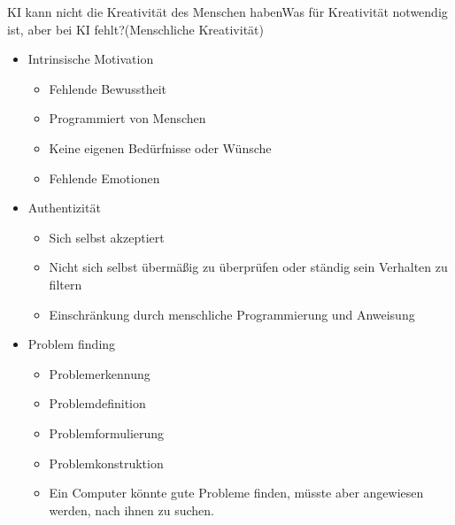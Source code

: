 \documentclass[169,9pt]{beamer}
\begin{document}
\begin{frame}{KI kann nicht die Kreativität des Menschen haben}{Was für Kreativität notwendig ist, aber bei KI fehlt?(Menschliche Kreativität)}
    \begin{itemize}
            \item<1-> Intrinsische Motivation
                \begin{itemize}
                    \item<1-> Fehlende Bewusstheit
                    \item<1-> Programmiert von Menschen
                    \item<1-> Keine eigenen Bedürfnisse oder Wünsche
                    \item<1-> Fehlende Emotionen 
                \end{itemize}
            \item<2-> Authentizität
            \begin{itemize}
                    \item<2-> Sich selbst akzeptiert
                    \item<2-> Nicht sich selbst übermäßig zu überprüfen oder ständig sein Verhalten zu filtern
                    \item<2-> Einschränkung durch menschliche Programmierung und Anweisung
                \end{itemize}
            \item<3-> Problem finding
                \begin{itemize}
                    \item<3-> Problemerkennung
                    \item<3-> Problemdefinition
                    \item<3-> Problemformulierung
                    \item<3-> Problemkonstruktion
                    \item<3-> Ein Computer könnte gute Probleme finden, müsste aber angewiesen werden, nach ihnen zu suchen.
                \end{itemize}            
    \end{itemize}
\end{frame}
\end{document}
